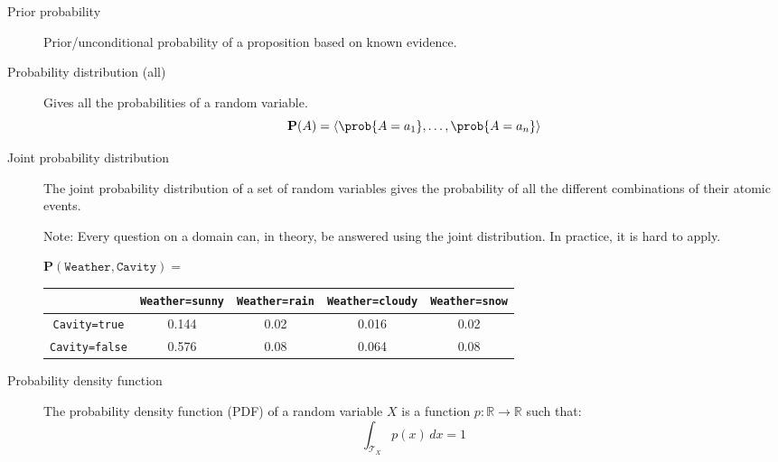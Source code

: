 \begin{description}
    \item[Prior probability] 
        Prior/unconditional probability of a proposition based on known evidence.
        
    \item[Probability distribution (all)] 
        Gives all the probabilities of a random variable.
        \[ \textbf{P}(A) = \langle \prob{A=a_1}, \dots, \prob{A=a_n} \rangle \]
    
    \item[Joint probability distribution] 
        The joint probability distribution of a set of random variables gives 
        the probability of all the different combinations of their atomic events.

        Note: Every question on a domain can, in theory, be answered using the joint distribution.
        In practice, it is hard to apply.

        \begin{example}
            $\textbf{P}(\texttt{Weather}, \texttt{Cavity}) = $
            \begin{center}
                \small
                \begin{tabular}{c | cccc}
                                            & \texttt{Weather=sunny} & \texttt{Weather=rain} & \texttt{Weather=cloudy} & \texttt{Weather=snow} \\
                    \hline
                    \texttt{Cavity=true}    & 0.144 & 0.02 & 0.016 & 0.02 \\
                    \texttt{Cavity=false}   & 0.576 & 0.08 & 0.064 & 0.08
                \end{tabular}
            \end{center}
        \end{example}

    \item[Probability density function] 
        The probability density function (PDF) of a random variable $X$ is a function $p: \mathbb{R} \rightarrow \mathbb{R}$
        such that:
        \[ \int_{\mathcal{T}_X} p(x) \,dx = 1 \]
\end{description}
